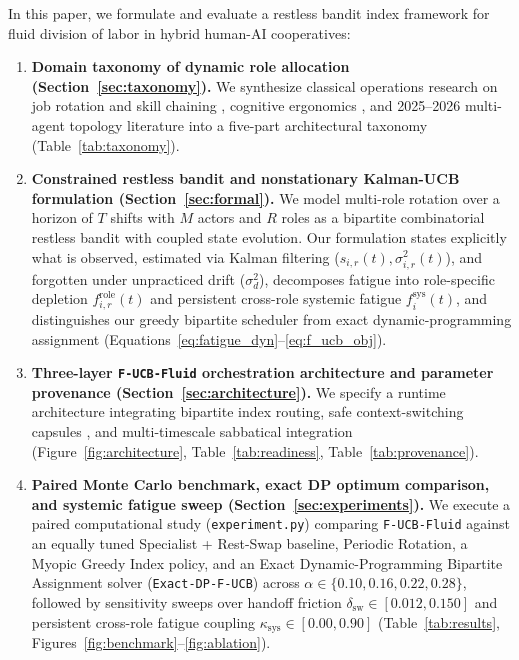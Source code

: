 \documentclass[11pt]{article}
\begin{document}
In this paper, we formulate and evaluate a restless bandit index framework for fluid division of labor in hybrid human-AI cooperatives:
\begin{enumerate}
  \item \textbf{Domain taxonomy of dynamic role allocation (Section~\ref{sec:taxonomy}).} We synthesize classical operations research on job rotation and skill chaining \citep{jaber1996learning, ortega2001jobrotation, hopp2004chaining}, cognitive ergonomics \citep{meijman1998effort, ryan2000sdt}, and 2025--2026 multi-agent topology literature \citep{cemri2025mast, li2025argdesigner, das2026safecontext} into a five-part architectural taxonomy (Table~\ref{tab:taxonomy}).
  \item \textbf{Constrained restless bandit and nonstationary Kalman-UCB formulation (Section~\ref{sec:formal}).} We model multi-role rotation over a horizon of $T$ shifts with $M$ actors and $R$ roles as a bipartite combinatorial restless bandit \citep{whittle1988restless} with coupled state evolution. Our formulation states explicitly what is observed, estimated via Kalman filtering ($\hat{s}_{i,r}(t),\allowbreak \sigma_{i,r}^2(t)$), and forgotten under unpracticed drift ($\sigma_d^2$), decomposes fatigue into role-specific depletion $f_{i,r}^{\mathrm{role}}(t)$ and persistent cross-role systemic fatigue $f_i^{\mathrm{sys}}(t)$, and distinguishes our greedy bipartite scheduler from exact dynamic-programming assignment (Equations~\ref{eq:fatigue_dyn}--\ref{eq:f_ucb_obj}).
  \item \textbf{Three-layer \texttt{F-UCB-Fluid} orchestration architecture and parameter provenance (Section~\ref{sec:architecture}).} We specify a runtime architecture integrating bipartite index routing, safe context-switching capsules \citep{das2026safecontext, rodrigues2026drift}, and multi-timescale sabbatical integration (Figure~\ref{fig:architecture}, Table~\ref{tab:readiness}, Table~\ref{tab:provenance}).
  \item \textbf{Paired Monte Carlo benchmark, exact DP optimum comparison, and systemic fatigue sweep (Section~\ref{sec:experiments}).} We execute a paired computational study (\texttt{experiment.\linebreak[0]py}) comparing \texttt{F-UCB-Fluid} against an equally tuned Specialist + Rest-Swap baseline, Periodic Rotation, a Myopic Greedy Index policy, and an Exact Dynamic-Programming Bipartite Assignment solver (\texttt{Exact-DP-F-UCB}) across $\alpha \in \{0.10,\allowbreak 0.16,\allowbreak 0.22,\allowbreak 0.28\}$, followed by sensitivity sweeps over handoff friction $\delta_{\mathrm{sw}} \allowbreak \in [0.012,\allowbreak 0.150]$ and persistent cross-role fatigue coupling $\kappa_{\mathrm{sys}} \allowbreak \in [0.00,\allowbreak 0.90]$ (Table~\ref{tab:results}, Figures~\ref{fig:benchmark}--\ref{fig:ablation}).

\end{enumerate}
\end{document}
